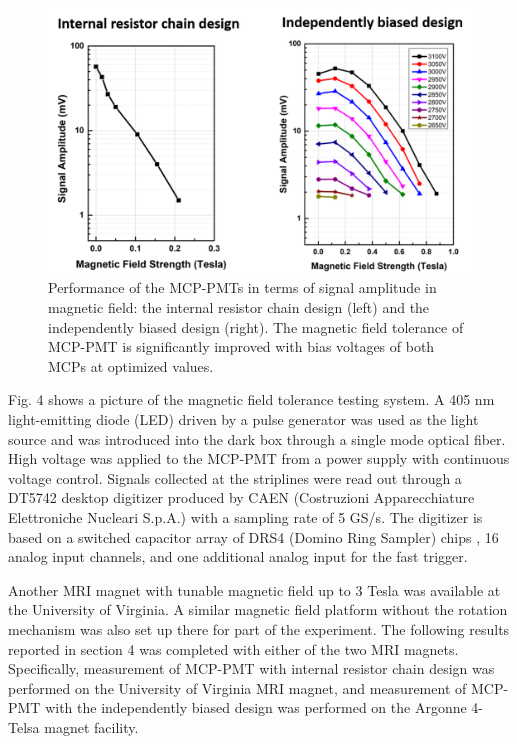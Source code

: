 \documentclass[preprint,5p]{elsarticle}
\begin{document}
\begin{figure}[tbp]
\centering \includegraphics[scale=0.7]{fig/epQ12a.png}
\caption{Performance of the MCP-PMTs in terms of signal amplitude in magnetic 
   field: the internal resistor chain design (left) and the independently 
   biased design (right). The magnetic field tolerance of MCP-PMT is 
   significantly improved with bias voltages of both MCPs at optimized values.  
   } \label{fig:design}
\end{figure}



Fig. 4 shows a picture of the magnetic field tolerance testing system. A 405 nm 
light-emitting diode (LED) driven by a pulse generator was used as the light 
source and was introduced into the dark box through a single mode optical 
fiber. High voltage was applied to the MCP-PMT from a power supply with 
continuous voltage control. Signals collected at the striplines were read out 
through a DT5742 desktop digitizer \cite{19} produced by CAEN (Costruzioni 
Apparecchiature Elettroniche Nucleari S.p.A.) with a sampling rate of 5 GS/s.  
The digitizer is based on a switched capacitor array of DRS4 (Domino Ring 
Sampler) chips \cite{20}, 16 analog input channels, and one additional analog 
input for the fast trigger. 

Another MRI magnet with tunable magnetic field up to 3 Tesla was available at 
the University of Virginia. A similar magnetic field platform without the 
rotation mechanism was also set up there for part of the experiment. The 
following results reported in section 4 was completed with either of the two 
MRI magnets. Specifically, measurement of MCP-PMT with internal resistor chain 
design was performed on the University of Virginia MRI magnet, and measurement 
of MCP-PMT with the independently biased design was performed on the Argonne 
4-Telsa magnet facility. 
\end{document}
